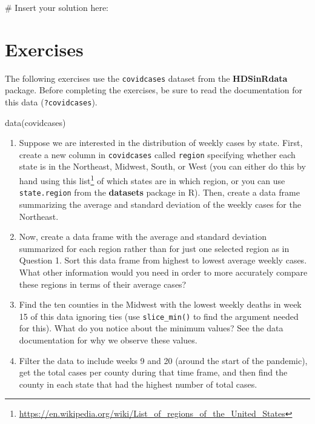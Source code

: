 \documentclass[
  letterpaper,
]{latex/krantz}
\makeatletter
\newenvironment{Shaded}{\begin{snugshade}}{\end{snugshade}}
\newcommand{\CommentTok}[1]{\textcolor[rgb]{0.37,0.37,0.37}{#1}}
\newcommand{\FunctionTok}[1]{\textcolor[rgb]{0.28,0.35,0.67}{#1}}
\newcommand{\NormalTok}[1]{\textcolor[rgb]{0.00,0.23,0.31}{#1}}
\renewcommand{\href}[2]{#2\footnote{\url{#1}}}
\newenvironment{kframe}{%
\medskip{}
\setlength{\fboxsep}{.8em}
 \def\at@end@of@kframe{}%
 \ifinner\ifhmode%
  \def\at@end@of@kframe{\end{minipage}}%
  \begin{minipage}{\columnwidth}%
 \fi\fi%
 \def\FrameCommand##1{\hskip\@totalleftmargin \hskip-\fboxsep
 \colorbox{shadecolor}{##1}\hskip-\fboxsep
     \hskip-\linewidth \hskip-\@totalleftmargin \hskip\columnwidth}%
 \MakeFramed {\advance\hsize-\width
   \@totalleftmargin\z@ \linewidth\hsize
   \@setminipage}}%
 {\par\unskip\endMakeFramed%
 \at@end@of@kframe}
\renewenvironment{Shaded}{\begin{kframe}}{\end{kframe}}
\makeatother
\begin{document}
\begin{Shaded}
\begin{Highlighting}[]
\CommentTok{\# Insert your solution here:}
\end{Highlighting}
\end{Shaded}

\section{Exercises}\label{exercises-3}

The following exercises use the \texttt{covidcases} dataset
 from the
\textbf{HDSinRdata} package. Before
completing the exercises, be sure to read the documentation for this
data (\texttt{?covidcases}).

\begin{Shaded}
\begin{Highlighting}[]
\FunctionTok{data}\NormalTok{(covidcases)}
\end{Highlighting}
\end{Shaded}

\begin{enumerate}
\def\labelenumi{\arabic{enumi}.}
\item
  Suppose we are interested in the distribution of weekly cases by
  state. First, create a new column in \texttt{covidcases} called
  \texttt{region} specifying whether each state is in the Northeast,
  Midwest, South, or West (you can either do this by hand using
  \href{https://en.wikipedia.org/wiki/List_of_regions_of_the_United_States}{this
  list} of which states are in which region, or you can use
  \texttt{state.region} from the \textbf{datasets} package in R). Then,
  create a data frame summarizing the average and standard deviation of
  the weekly cases for the Northeast.
\item
  Now, create a data frame with the average and standard deviation
  summarized for each region rather than for just one selected region as
  in Question 1. Sort this data frame from highest to lowest average
  weekly cases. What other information would you need in order to more
  accurately compare these regions in terms of their average cases?
\item
  Find the ten counties in the Midwest with the lowest weekly deaths in
  week 15 of this data ignoring ties (use \texttt{slice\_min()} to find
  the argument needed for this). What do you notice about the minimum
  values? See the data documentation for why we observe these values.
\item
  Filter the data to include weeks 9 and 20 (around the start of the
  pandemic), get the total cases per county during that time frame, and
  then find the county in each state that had the highest number of
  total cases.
\end{enumerate}
\end{document}
